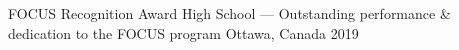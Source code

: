 









\begin{cvhonors}

  \cvhonor
    {FOCUS Recognition Award} %
    {High School — Outstanding performance \& dedication to the FOCUS program} %
    {Ottawa, Canada} %
    {2019} %

\end{cvhonors}

